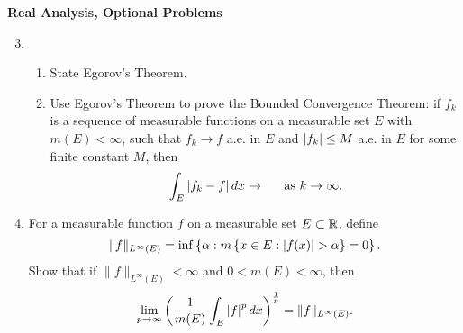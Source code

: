 \documentclass[11pt,twoside]{amsart}
\theoremstyle{plain}
\begin{document}
\begin{center}
    {\bf\Large Real Analysis, Optional Problems}
\end{center}
\begin{enumerate}
    \setcounter{enumi}{2}
    \item \begin{enumerate}
    \item State Egorov's Theorem.
    \item Use Egorov's Theorem to prove the Bounded Convergence Theorem: if ${f_k}$ is a sequence of measurable functions on a measurable set $E$ with $m(E) < \infty$, such that $f_k \rightarrow f$ a.e. in $E$ and $\left| f_k \right| \leq M$ a.e. in $E$ for some finite constant $M$, then
    \[
        \int_E{\left| f_k-f \right|dx}\rightarrow \textrm{\hspace{12pt} as } k\rightarrow\infty.
    \]
    \end{enumerate}
    \vspace{12pt}
    \item For a measurable function $f$ on a measurable set $E\subset\mathbb{R}$, define
    \[
        \| f \|_{L^{\infty}(E)} = \inf\left\{\alpha : m\left\{x\in E : \card{f(x)}>\alpha\right\} = 0\right\}.
    \]
    Show that if $\| f \|_{L^{\infty}(E)} < \infty$ and $0 < m(E) < \infty$, then
    \[
        \lim_{p\rightarrow\infty}\left(\frac{1}{m(E)}\int_{E}{\left| f \right|^pdx}\right)^{\frac{1}{p}} = \| f \|_{L^{\infty}(E)}.
    \]
\end{enumerate}
\end{document}
